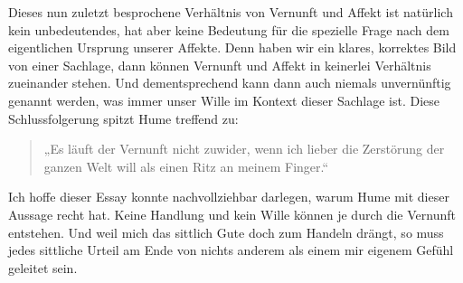 \documentclass[ngerman,12pt]{diazessay} %
\begin{document}
\begin{doublespace}
Dieses nun zuletzt besprochene Verhältnis von Vernunft und Affekt ist natürlich kein unbedeutendes, hat aber keine Bedeutung für die spezielle Frage nach dem eigentlichen Ursprung unserer Affekte. Denn haben wir ein klares, korrektes Bild von einer Sachlage, dann können Vernunft und Affekt in keinerlei Verhältnis zueinander stehen. Und dementsprechend kann dann auch niemals unvernünftig genannt werden, was immer unser Wille im Kontext dieser Sachlage ist.
Diese Schlussfolgerung spitzt Hume treffend zu:
\begin{quote}
„Es läuft der Vernunft nicht zuwider,
wenn ich lieber die Zerstörung der ganzen Welt will als einen
Ritz an meinem Finger.“ \cite[siehe S.487]{Hume.2013}
\end{quote}
Ich hoffe dieser Essay konnte nachvollziehbar darlegen, warum Hume mit dieser Aussage recht hat. Keine Handlung und kein Wille können je durch die Vernunft entstehen. Und weil mich das sittlich Gute doch zum Handeln drängt, so muss jedes sittliche Urteil am Ende von nichts anderem als einem mir eigenem Gefühl geleitet sein.
\newpage
\printbibliography


\end{doublespace}
\end{document}
